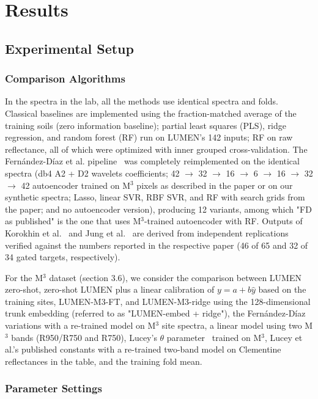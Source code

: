 \documentclass[remotesensing,article,submit,pdftex,moreauthors]{Definitions/mdpi}
\begin{document}
\section{Results}

\subsection{Experimental Setup}

\subsubsection{Comparison Algorithms}

In the spectra in the lab, all the methods use identical spectra and folds. Classical baselines are implemented using the fraction-matched average of the training soils (zero information baseline); partial least squares (PLS), ridge regression, and random forest (RF) run on LUMEN's 142 inputs; RF on raw reflectance, all of which were optimized with inner grouped cross-validation. The Fernández-Díaz et al. pipeline~\cite{fernandez2026} was completely reimplemented on the identical spectra (db4 A2 + D2 wavelets coefficients; 42 $\rightarrow$ 32 $\rightarrow$ 16 $\rightarrow$ 6 $\rightarrow$ 16 $\rightarrow$ 32 $\rightarrow$ 42 autoencoder trained on M$^{3}$ pixels as described in the paper or on our synthetic spectra; Lasso, linear SVR, RBF SVR, and RF with search grids from the paper; and no autoencoder version), producing 12 variants, among which "FD as published" is the one that uses M$^{3}$-trained autoencoder with RF. Outputs of Korokhin et al.~\cite{korokhin2024} and Jung et al.~\cite{jung2026} are derived from independent replications verified against the numbers reported in the respective paper (46 of 65 and 32 of 34 gated targets, respectively).

For the M$^{3}$ dataset (section 3.6), we consider the comparison between LUMEN zero-shot, zero-shot LUMEN plus a linear calibration of $y = a + b\hat y$ based on the training sites, LUMEN-M3-FT, and LUMEN-M3-ridge using the 128-dimensional trunk embedding (referred to as "LUMEN-embed + ridge"), the Fernández-Díaz variations with a re-trained model on M$^{3}$ site spectra, a linear model using two M$^{3}$ bands (R950/R750 and R750), Lucey's $\theta$ parameter~\cite{lucey2000} trained on M$^{3}$, Lucey et al.'s published constants with a re-trained two-band model on Clementine reflectances in the table, and the training fold mean.

\subsubsection{Parameter Settings}
\end{document}
